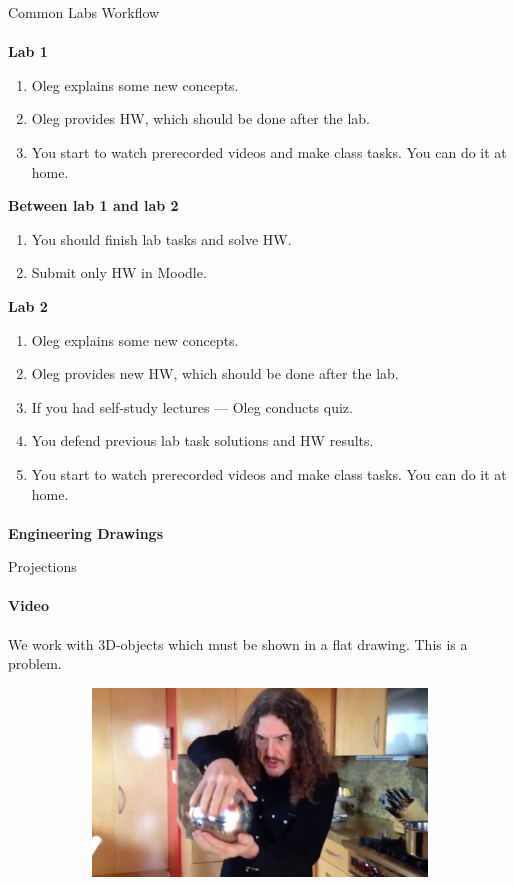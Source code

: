\documentclass[aspectratio=169]{beamer}
\begin{document}
\begin{frame}[t]{Common Labs Workflow}
\framesubtitle{}
\vspace{-0.4cm}

    \textbf{Lab 1}
    \begin{enumerate}
        \scriptsize
        \item Oleg explains some new concepts.
        \item Oleg provides HW, which should be done after the lab.
        \item You start to watch prerecorded videos and make class tasks. You can do it at home.
    \end{enumerate}
    \textbf{Between lab 1 and lab 2}
    \begin{enumerate}
        \scriptsize
        \item You should finish lab tasks and solve HW.
        \item Submit only HW in Moodle.
    \end{enumerate}
    \textbf{Lab 2}
    \begin{enumerate}
        \scriptsize
        \item Oleg explains some new concepts.
        \item Oleg provides new HW, which should be done after the lab.
        \item If you had self-study lectures --- Oleg conducts quiz.
        \item You defend previous lab task solutions and HW results.
        \item You start to watch prerecorded videos and make class tasks. You can do it at home.
    \end{enumerate}
\end{frame}

\begin{frame}[c]{}
    \framesubtitle{}
    \LARGE \centering
    \textbf{Engineering Drawings}
\end{frame}

\begin{frame}[t]{Projections}
    \framesubtitle{Video}
    \vspace{-0.3cm}
    We work with 3D-objects which must be shown in a flat drawing. This is a problem.

    \begin{figure}[H]
        \href{https://youtu.be/_SZkh6w_4EA}{
            \centering\includegraphics[height=5cm,width=1\textwidth,keepaspectratio]{resources/projection_video.jpg}}
        \label{fig:resources/projection_video.jpg}
    \end{figure}
\end{frame}
\end{document}
